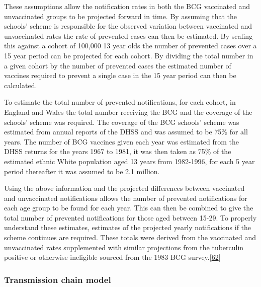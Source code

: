 \documentclass[11pt,twoside]{bristolthesis}
\begin{document}
  These assumptions allow the notification rates in both the BCG vaccinated and unvaccinated groups to be projected forward in time. By assuming that the schools' scheme is responsible for the observed variation between vaccinated and unvaccinated rates the rate of prevented cases can then be estimated. By scaling this against a cohort of 100,000 13 year olds the number of prevented cases over a 15 year period can be projected for each cohort. By dividing the total number in a given cohort by the number of prevented cases the estimated number of vaccines required to prevent a single case in the 15 year period can then be calculated.
  
  To estimate the total number of prevented notifications, for each cohort, in England and Wales the total number receiving the BCG and the coverage of the schools' scheme was required. The coverage of the BCG schools' scheme was estimated from annual reports of the DHSS and was assumed to be 75\% for all years. The number of BCG vaccines given each year was estimated from the DHSS returns for the years 1967 to 1981, it was then taken as 75\% of the estimated ethnic White population aged 13 years from 1982-1996, for each 5 year period thereafter it was assumed to be 2.1 million.
  
  Using the above information and the projected differences between vaccinated and unvaccinated notifications allows the number of prevented notifications for each age group to be found for each year. This can then be combined to give the total number of prevented notifications for those aged between 15-29. To properly understand these estimates, estimates of the projected yearly notifications if the scheme continues are required. These totals were derived from the vaccinated and unvaccinated rates supplemented with similar projections from the tuberculin positive or otherwise ineligible sourced from the 1983 BCG survey.{[}\protect\hyperlink{ref-Sutherland1987a}{62}{]}
  
  \hypertarget{transmission-chain-model}{%
  \subsubsection{Transmission chain model}\label{transmission-chain-model}}
  
\end{document}
